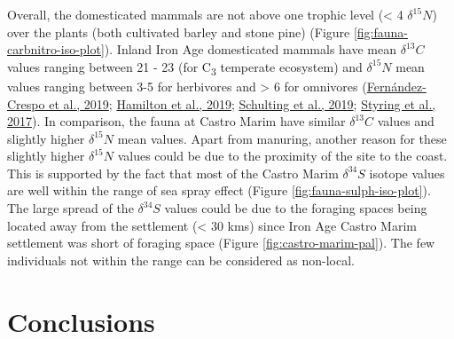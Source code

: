 \documentclass[preprint, 3p, authoryear]{elsarticle} %
\begin{document}
Overall, the domesticated mammals are not above one trophic level (\textless{} 4\text{\textperthousand} \(\delta^{15}N\)) over the plants (both cultivated barley and stone pine) (Figure \ref{fig:fauna-carbnitro-iso-plot}). Inland Iron Age domesticated mammals have mean \(\delta ^{13}C\) values ranging between 21 - 23\text{\textperthousand} (for C\textsubscript{3} temperate ecosystem) and \(\delta ^{15}N\) mean values ranging between 3-5\text{\textperthousand} for herbivores and \textgreater{} 6\text{\textperthousand} for omnivores (\protect\hyperlink{ref-fernandez-crespo_etal19}{Fernández-Crespo et al., 2019}; \protect\hyperlink{ref-hamilton_etal19}{Hamilton et al., 2019}; \protect\hyperlink{ref-schulting_etal19}{Schulting et al., 2019}; \protect\hyperlink{ref-styring_etal17}{Styring et al., 2017}). In comparison, the fauna at Castro Marim have similar \(\delta ^{13}C\) values and slightly higher \(\delta ^{15}N\) mean values. Apart from manuring, another reason for these slightly higher \(\delta^{15}N\) values could be due to the proximity of the site to the coast. This is supported by the fact that most of the Castro Marim \(\delta ^{34}S\) isotope values are well within the range of sea spray effect (Figure \ref{fig:fauna-sulph-iso-plot}). The large spread of the \(\delta ^{34}S\) values could be due to the foraging spaces being located away from the settlement (\textless{} 30 kms) since Iron Age Castro Marim settlement was short of foraging space (Figure \ref{fig:castro-marim-pal}). The few individuals not within the range can be considered as non-local.

\hypertarget{conclusions}{%
\section{Conclusions}\label{conclusions}}
\end{document}
